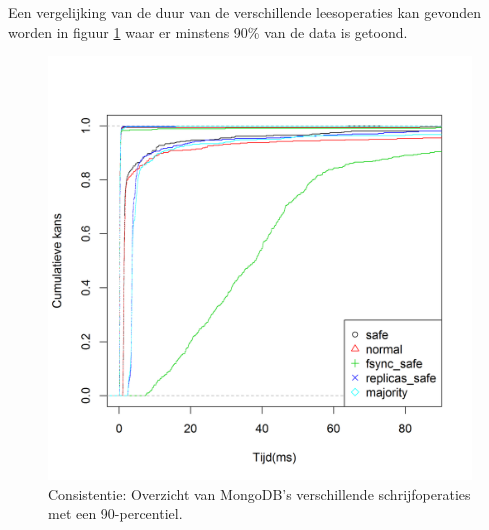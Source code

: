 Een vergelijking van de duur van de verschillende leesoperaties kan gevonden worden in figuur \ref{fig:consistentie-mongodb-all-mongodb-write} waar er minstens 90\% van de data is getoond. 

\begin{figure}[htb!] 
	\centering
	\includegraphics[width=.42\textwidth]{img/Observaties/MongoDB/ECDF-Compare-Write-insert-1}
	\caption{Consistentie: Overzicht van MongoDB's verschillende schrijfoperaties met een 90-percentiel. }
	\label{fig:consistentie-mongodb-all-mongodb-write}
\end{figure}

